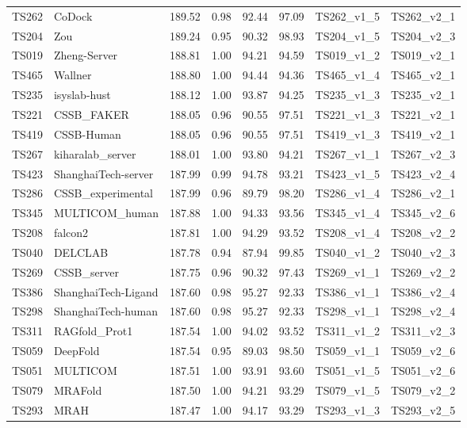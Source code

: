 \begin{table}[ht]
{\begin{tabular}{llllllll}
TS262 & CoDock & 189.52 & 0.98 & 92.44 & 97.09 & TS262\_v1\_5 & TS262\_v2\_1 \\ 
TS204 & Zou & 189.24 & 0.95 & 90.32 & 98.93 & TS204\_v1\_5 & TS204\_v2\_3 \\ 
TS019 & Zheng-Server & 188.81 & 1.00 & 94.21 & 94.59 & TS019\_v1\_2 & TS019\_v2\_1 \\ 
TS465 & Wallner & 188.80 & 1.00 & 94.44 & 94.36 & TS465\_v1\_4 & TS465\_v2\_1 \\ 
TS235 & isyslab-hust & 188.12 & 1.00 & 93.87 & 94.25 & TS235\_v1\_3 & TS235\_v2\_1 \\ 
TS221 & CSSB\_FAKER & 188.05 & 0.96 & 90.55 & 97.51 & TS221\_v1\_3 & TS221\_v2\_1 \\ 
TS419 & CSSB-Human & 188.05 & 0.96 & 90.55 & 97.51 & TS419\_v1\_3 & TS419\_v2\_1 \\ 
TS267 & kiharalab\_server & 188.01 & 1.00 & 93.80 & 94.21 & TS267\_v1\_1 & TS267\_v2\_3 \\ 
TS423 & ShanghaiTech-server & 187.99 & 0.99 & 94.78 & 93.21 & TS423\_v1\_5 & TS423\_v2\_4 \\ 
TS286 & CSSB\_experimental & 187.99 & 0.96 & 89.79 & 98.20 & TS286\_v1\_4 & TS286\_v2\_1 \\ 
TS345 & MULTICOM\_human & 187.88 & 1.00 & 94.33 & 93.56 & TS345\_v1\_4 & TS345\_v2\_6 \\ 
TS208 & falcon2 & 187.81 & 1.00 & 94.29 & 93.52 & TS208\_v1\_4 & TS208\_v2\_2 \\ 
TS040 & DELCLAB & 187.78 & 0.94 & 87.94 & 99.85 & TS040\_v1\_2 & TS040\_v2\_3 \\ 
TS269 & CSSB\_server & 187.75 & 0.96 & 90.32 & 97.43 & TS269\_v1\_1 & TS269\_v2\_2 \\ 
TS386 & ShanghaiTech-Ligand & 187.60 & 0.98 & 95.27 & 92.33 & TS386\_v1\_1 & TS386\_v2\_4 \\ 
TS298 & ShanghaiTech-human & 187.60 & 0.98 & 95.27 & 92.33 & TS298\_v1\_1 & TS298\_v2\_4 \\ 
TS311 & RAGfold\_Prot1 & 187.54 & 1.00 & 94.02 & 93.52 & TS311\_v1\_2 & TS311\_v2\_3 \\ 
TS059 & DeepFold & 187.54 & 0.95 & 89.03 & 98.50 & TS059\_v1\_1 & TS059\_v2\_6 \\ 
TS051 & MULTICOM & 187.51 & 1.00 & 93.91 & 93.60 & TS051\_v1\_5 & TS051\_v2\_6 \\ 
TS079 & MRAFold & 187.50 & 1.00 & 94.21 & 93.29 & TS079\_v1\_5 & TS079\_v2\_2 \\ 
TS293 & MRAH & 187.47 & 1.00 & 94.17 & 93.29 & TS293\_v1\_3 & TS293\_v2\_5 \\ 

\end{tabular}}
\end{table}
